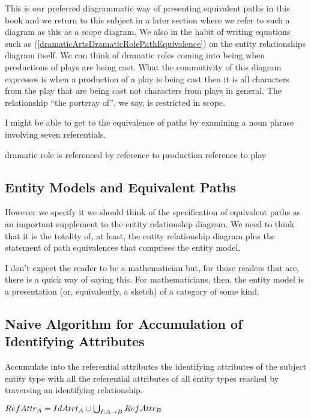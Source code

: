 This is our preferred diagrammatic way of presenting equivalent paths in this book and we return to this subject in a later section where we refer to such a diagram as this as a scope diagram. 
We also in the habit of writing equations such as (\ref{dramaticArtsDramaticRolePathEquivalence}) on the entity relationships diagram itself.
We can think of dramatic roles coming into being when productions of plays are being cast. What the commutivity of this diagram expresses is when a production of a play is being cast then it is all characters from the play that are being cast not characters from plays in general. 
The relationship ``the portrray of'', we say, is restricted in scope.

\begin{noteforfuture}
I might be able to get to the equivalence of paths by examining
a noun phrase involving seven referentials.

dramatic role is referenced by reference to production reference to play
\end{noteforfuture}

\subsection{Entity Models and Equivalent Paths}
However we specify it we should think of the specification of equivalent paths as 
an important supplement to the entity relationship diagram. 
We need to think that it is the totality of, 
at least,
the entity relationship diagram  plus the statement of path equivalences that comprises the entity model.

I don't expect the reader to be a mathematician but, for those readers that are, there is a quick way of saying this. 
For mathematicians, then,  the entity model is a presentation (or, equivalently, a sketch)
 of a category of some kind.  


\subsection{Naive Algorithm for Accumulation of Identifying Attributes}
\mynote
Accumulate into the referential attributes the identifying attributes of the subject entity type
with all the referential attributes of all entity types reached by traversing an identifying relationship.


$RefAttr_A=IdAtrt_A \cup \bigcup_{I:A \rightarrow B}RefAttr_B$

